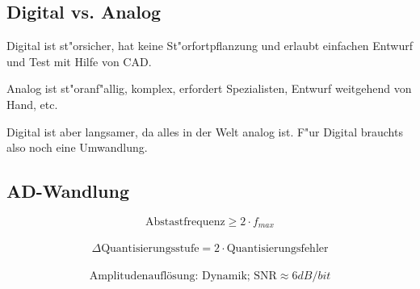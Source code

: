 \begin{multicols}{2}
\section{Digital vs. Analog}
Digital ist st"orsicher, hat keine St"orfortpflanzung und erlaubt einfachen Entwurf und Test mit Hilfe von CAD.

Analog ist st"oranf"allig, komplex, erfordert Spezialisten, Entwurf weitgehend von Hand, etc.

Digital ist aber langsamer, da alles in der Welt analog ist. F"ur Digital brauchts also noch eine Umwandlung.
\subsection{AD-Wandlung}
$$ \text{Abstastfrequenz} \geq 2\cdot f_{max}$$\\
$$ \Delta \text{Quantisierungsstufe} = 2 \cdot \text{Quantisierungsfehler}$$\\
$$\text{Amplitudenauflösung: Dynamik; SNR} \approx 6dB/bit$$
\end{multicols}

